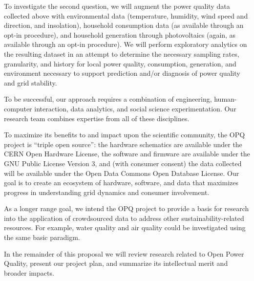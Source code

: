 To investigate the second question, we will augment the power quality data collected above with environmental data (temperature, humidity, wind speed and direction, and insolation), household consumption data (as available through an opt-in procedure), and household generation through photovoltaics (again, as available through an opt-in procedure).  We will perform exploratory analytics on the resulting dataset in an attempt to determine the necessary sampling rates, granularity, and history for local power quality, consumption, generation, and environment necessary to support prediction and/or diagnosis of power quality and grid stability. 

To be successful, our approach requires a combination of engineering, human-computer interaction, data analytics, and social science experimentation.  Our research team combines expertise from all of these disciplines. 

To maximize its benefits to and impact upon the scientific community, the OPQ project is ``triple open source'': the hardware schematics are available under the CERN Open Hardware License, the software and firmware are available under the GNU Public License Version 3, and (with consumer consent) the data collected will be available under the Open Data Commons Open Database License.  Our goal is to create an ecosystem of hardware, software, and data that maximizes progress in understanding grid dynamics and consumer involvement. 

As a longer range goal, we intend the OPQ project to provide a basis for research into the application of crowdsourced data to address other sustainability-related resources.  For example, water quality and air quality could be investigated using the same basic paradigm. 

In the remainder of this proposal we will review research related to Open Power Quality, present our project plan, and summarize its intellectual merit and broader impacts.



